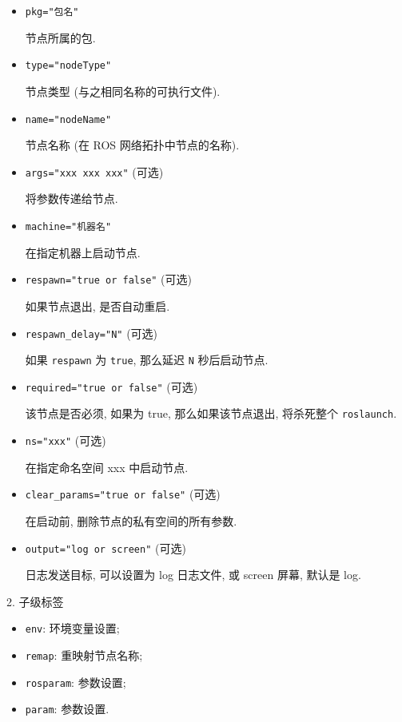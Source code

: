 \documentclass[openany, fontset=windowsold]{ctexbook}
\theoremstyle{kaiti}
\theoremstyle{normal}
\begin{document}
\begin{itemize}
  \item \verb|pkg="包名"|

  节点所属的包.

  \item \verb|type="nodeType"|

  节点类型 (与之相同名称的可执行文件).

  \item \verb|name="nodeName"|

  节点名称 (在 ROS 网络拓扑中节点的名称).

  \item \verb|args="xxx xxx xxx"| (可选)

  将参数传递给节点.

  \item \verb|machine="机器名"|

  在指定机器上启动节点.

  \item \verb|respawn="true or false"| (可选)

  如果节点退出, 是否自动重启.

  \item \verb|respawn_delay="N"| (可选)

  如果 \verb|respawn| 为 \verb|true|, 那么延迟 \verb|N| 秒后启动节点.

  \item \verb|required="true or false"| (可选)

  该节点是否必须, 如果为 true, 那么如果该节点退出, 将杀死整个 \verb|roslaunch|.

  \item \verb|ns="xxx"| (可选)

  在指定命名空间 xxx 中启动节点.

  \item \verb|clear_params="true or false"| (可选)

  在启动前, 删除节点的私有空间的所有参数.

  \item \verb|output="log or screen"| (可选)

  日志发送目标, 可以设置为 log 日志文件, 或 screen 屏幕, 默认是 log.
\end{itemize}

2. 子级标签

\begin{itemize}
  \item \verb|env|: 环境变量设置;
  \item \verb|remap|: 重映射节点名称;
  \item \verb|rosparam|: 参数设置;
  \item \verb|param|: 参数设置.
\end{itemize}
\end{document}
